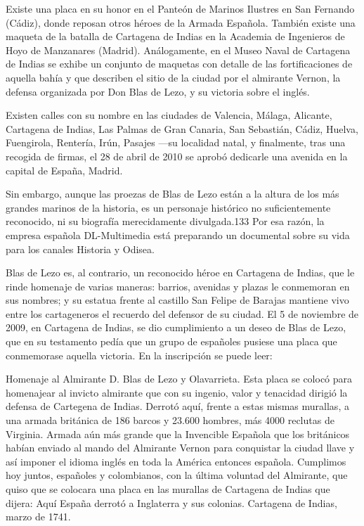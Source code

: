 Existe una placa en su honor en el Panteón de Marinos Ilustres en San
Fernando (Cádiz), donde reposan otros héroes de la Armada
Española.  También existe una maqueta de la
batalla de Cartagena de Indias  en la
Academia de Ingenieros de Hoyo de Manzanares (Madrid). Análogamente,
en el Museo Naval de Cartagena de Indias se exhibe un conjunto de
maquetas con detalle de las fortificaciones de aquella bahía y que
describen el sitio de la ciudad por el almirante Vernon, la defensa
organizada por Don Blas de Lezo,  y su victoria
sobre el inglés.

Existen calles con su nombre en las ciudades de Valencia, Málaga,
Alicante, Cartagena de Indias, Las Palmas de Gran Canaria, San
Sebastián, Cádiz, Huelva, Fuengirola, Rentería, Irún, Pasajes ---su
localidad natal, y finalmente, tras una recogida de firmas, el 28
de abril de 2010 se aprobó dedicarle una avenida en la capital de
España, Madrid.

Sin embargo, aunque las proezas de Blas de Lezo 
están a la altura de los más grandes marinos de la historia, es un
personaje histórico no suficientemente reconocido, ni su biografía
merecidamente divulgada.133 Por esa razón, la empresa española
DL-Multimedia está preparando un documental sobre su vida para los
canales Historia y Odisea.

Blas de Lezo  es, al contrario, un reconocido
héroe en Cartagena de Indias, que le rinde homenaje de varias maneras:
barrios, avenidas y plazas le conmemoran en sus nombres; y su estatua
frente al castillo San Felipe de Barajas mantiene vivo entre los
cartageneros el recuerdo del defensor de su ciudad. El 5 de noviembre
de 2009, en Cartagena de Indias, se dio cumplimiento a un deseo de
Blas de Lezo, que en su testamento pedía que un grupo de españoles
pusiese una placa que conmemorase aquella victoria. En la inscripción
se puede leer:

\begin{displayquote}
  Homenaje al Almirante D. Blas de Lezo y Olavarrieta. Esta placa se
  colocó para homenajear al invicto almirante que con su ingenio,
  valor y tenacidad dirigió la defensa de Cartegena de Indias. Derrotó
  aquí, frente a estas mismas murallas, a una armada británica
   de 186 barcos y 23.600 hombres, más 4000
  reclutas de Virginia. Armada aún más grande que la Invencible
  Española que los británicos habían enviado al mando del Almirante
  Vernon para conquistar la ciudad llave y así imponer el idioma
  inglés en toda la América entonces española. Cumplimos hoy juntos,
  españoles y colombianos, con la última voluntad del Almirante, que
  quiso que se colocara una placa en las murallas de Cartagena de
  Indias que dijera: Aquí España derrotó a Inglaterra y sus
  colonias. Cartagena de Indias, marzo de 1741.
\end{displayquote}

